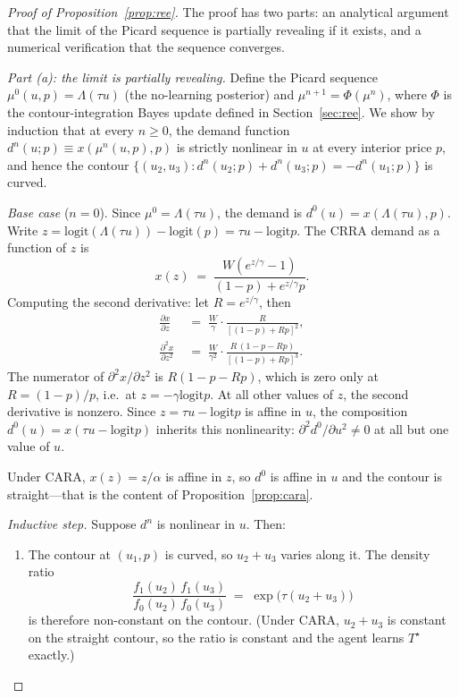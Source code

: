 \documentclass[12pt,letterpaper]{article}
\theoremstyle{definition}
\theoremstyle{remark}
\newcommand{\Lam}{\Lambda}            %
\newcommand{\logit}{\mathrm{logit}}
\newcommand{\Tstar}{T^{\!\star}}
\newcommand{\1}{\mathbf{1}}
\begin{document}
\begin{proof}[Proof of Proposition~\ref{prop:ree}]
The proof has two parts: an analytical argument that the limit of the
Picard sequence is partially revealing if it exists, and a numerical
verification that the sequence converges.

\emph{Part (a): the limit is partially revealing.} Define the Picard
sequence $\mu^{0}(u,p)=\Lam(\tau u)$ (the no-learning posterior) and
$\mu^{n+1}=\Phi(\mu^{n})$, where $\Phi$ is the contour-integration
Bayes update defined in Section~\ref{sec:ree}. We show by induction
that at every $n\geq 0$, the demand function
$d^{n}(u;p)\equiv x(\mu^{n}(u,p),p)$ is strictly nonlinear in $u$ at
every interior price $p$, and hence the contour
$\{(u_{2},u_{3}):d^{n}(u_{2};p)+d^{n}(u_{3};p)=-d^{n}(u_{1};p)\}$ is
curved.

\emph{Base case} ($n=0$). Since $\mu^{0}=\Lam(\tau u)$, the demand is
$d^{0}(u)=x(\Lam(\tau u),p)$. Write $z=\logit(\Lam(\tau u))-\logit(p)
=\tau u-\logit p$. The CRRA demand as a function of $z$ is
\[
   x(z) \;=\; \frac{W(e^{z/\gamma}-1)}{(1-p)+e^{z/\gamma}p}.
\]
Computing the second derivative: let $R=e^{z/\gamma}$, then
\begin{align*}
   \frac{\partial x}{\partial z}
   &\;=\; \frac{W}{\gamma}\cdot\frac{R}{[(1-p)+Rp]^{2}}, \\
   \frac{\partial^{2} x}{\partial z^{2}}
   &\;=\; \frac{W}{\gamma^{2}}\cdot\frac{R\,(1-p-Rp)}{[(1-p)+Rp]^{3}}.
\end{align*}
The numerator of $\partial^{2}x/\partial z^{2}$ is $R(1-p-Rp)$, which
is zero only at $R=(1-p)/p$, i.e.\ at $z=-\gamma\logit p$. At all other
values of $z$, the second derivative is nonzero. Since $z=\tau u-\logit p$
is affine in $u$, the composition $d^{0}(u)=x(\tau u-\logit p)$ inherits
this nonlinearity: $\partial^{2}d^{0}/\partial u^{2}\neq 0$ at all but
one value of $u$.

Under CARA, $x(z)=z/\alpha$ is affine in $z$, so $d^{0}$ is affine in
$u$ and the contour is straight---that is the content of
Proposition~\ref{prop:cara}.

\emph{Inductive step.} Suppose $d^{n}$ is nonlinear in $u$. Then:
\begin{enumerate}[label=(\roman*),topsep=2pt,itemsep=2pt]
\item The contour at $(u_{1},p)$ is curved, so $u_{2}+u_{3}$ varies along
it. The density ratio
\[
   \frac{f_{1}(u_{2})\,f_{1}(u_{3})}{f_{0}(u_{2})\,f_{0}(u_{3})}
   \;=\; \exp\!\bigl(\tau(u_{2}+u_{3})\bigr)
\]
is therefore non-constant on the contour. (Under CARA, $u_{2}+u_{3}$ is
constant on the straight contour, so the ratio is constant and the
agent learns $\Tstar$ exactly.)


\end{enumerate}
\end{proof}
\end{document}
